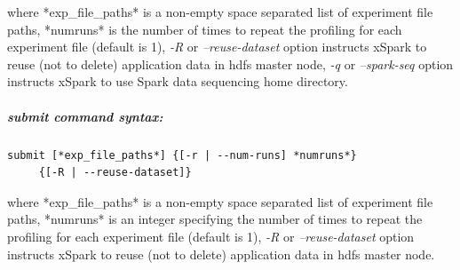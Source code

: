 where *exp\_file\_paths* is a non-empty space separated list of
experiment file paths, *numruns* is the number of times to repeat the
profiling for each experiment file (default is 1), \emph{-R} or
\emph{--reuse-dataset} option instructs xSpark to reuse (not to delete)
application data in hdfs master node, \emph{-q} or \emph{--spark-seq}
option instructs xSpark to use Spark data sequencing home directory.

\hypertarget{submit-command-syntax}{%
\subparagraph{\texorpdfstring{\emph{submit} command
		syntax:}{submit command syntax:}}\label{submit-command-syntax}}

\begin{verbatim}
submit [*exp_file_paths*] {[-r | --num-runs] *numruns*} 
     {[-R | --reuse-dataset]}      
\end{verbatim}

where *exp\_file\_paths* is a non-empty space separated list of
experiment file paths, *numruns* is an integer specifying the number of
times to repeat the profiling for each experiment file (default is 1),
\emph{-R} or \emph{--reuse-dataset} option instructs xSpark to reuse
(not to delete) application data in hdfs master node.

%

%

